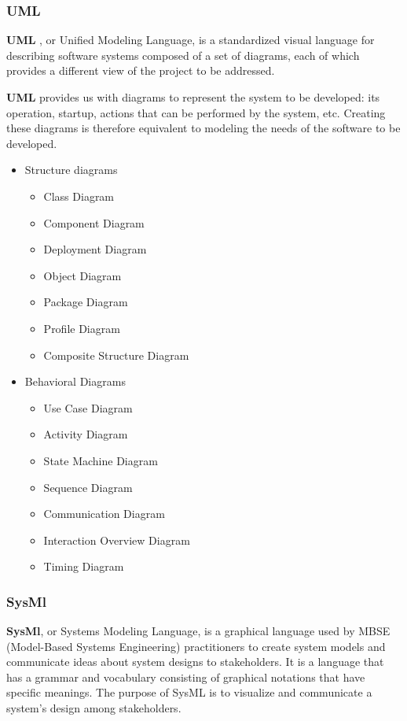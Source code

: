 \subsubsection{UML}

\textbf{UML} , or Unified Modeling Language, is a standardized visual language for describing software systems composed of a set of diagrams, each of which provides a different view of the project to be addressed.\cite{HMB03}

\textbf{UML}  provides us with diagrams to represent the system to be developed: its operation, startup, actions that can be performed by the system, etc. Creating these diagrams is therefore equivalent to modeling the needs of the software to be developed.\cite{HMB03}

\begin{itemize}
\item Structure diagrams 
\begin{itemize}
\item Class Diagram
\item Component Diagram
\item Deployment Diagram
\item Object Diagram
\item Package Diagram
\item Profile Diagram
\item Composite Structure Diagram
\end{itemize}
\item Behavioral Diagrams
\begin{itemize}
\item Use Case Diagram
\item Activity Diagram
\item State Machine Diagram
\item Sequence Diagram
\item Communication Diagram
\item Interaction Overview Diagram
\item Timing Diagram
\end{itemize}
\end{itemize}

\subsubsection{SysMl}
\textbf{SysMl},  or Systems Modeling Language, is a graphical language used by MBSE (Model-Based Systems Engineering) practitioners to create system models and communicate ideas about system designs to stakeholders. It is a language that has a grammar and vocabulary consisting of graphical notations that have specific meanings. The purpose of SysML is to visualize and communicate a system's design among stakeholders.\cite{LD13}

